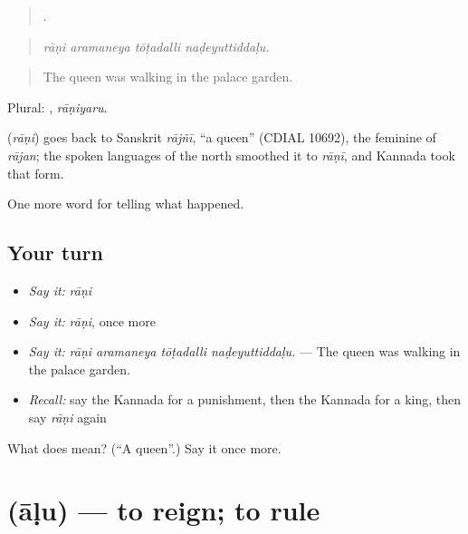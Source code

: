 \begin{quote}
   .
\end{quote}

\begin{quote}
\emph{rāṇi aramaneya tōṭadalli naḍeyuttiddaḷu.}
\end{quote}

\begin{quote}
The queen was walking in the palace garden.
\end{quote}

Plural: , \emph{rāṇiyaru}.

\begin{cousinweb}
\textbf{} (\emph{rāṇi}) goes back to Sanskrit \emph{rājñī}, \textquotedblleft{}a queen\textquotedblright{} (CDIAL 10692), the feminine of \emph{rājan}; the spoken languages of the north smoothed it to \emph{rāṇī}, and Kannada took that form.
\end{cousinweb}

\begin{grammarlens}[title={What you've built}]
One more word for telling what happened.
\end{grammarlens}

\subsection*{Your turn}
\begin{itemize}
\raggedright
  \item \emph{Say it:} \emph{rāṇi}
  \item \emph{Say it:} \emph{rāṇi}, once more
  \item \emph{Say it:} \emph{rāṇi aramaneya tōṭadalli naḍeyuttiddaḷu.} — The queen was walking in the palace garden.
  \item \emph{Recall:} say the Kannada for a punishment, then the Kannada for a king, then say \emph{rāṇi} again
\end{itemize}

\begin{tcolorbox}[breakable,colback=teal!4,colframe=teal!35!black,title={Before you move on}]
What does  mean? (\textquotedblleft{}A queen\textquotedblright{}.) Say it once more.
\end{tcolorbox}
\section[\texorpdfstring{\kn{ಆಳು} (āḷu)}{ಆಳು (āḷu)}]{ (āḷu) — to reign; to rule}

